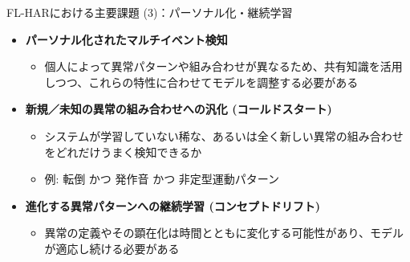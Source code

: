 \documentclass[unicode,12pt,aspectratio=169,dvipdfmx]{beamer}
\begin{document}
\begin{frame}{FL-HARにおける主要課題 (3)：パーソナル化・継続学習}
\begin{itemize}
    \item \textbf{パーソナル化されたマルチイベント検知}
    \begin{itemize}
        \item 個人によって異常パターンや組み合わせが異なるため、共有知識を活用しつつ、これらの特性に合わせてモデルを調整する必要がある
    \end{itemize}
    \item \textbf{新規／未知の異常の組み合わせへの汎化 (コールドスタート)}
    \begin{itemize}
        \item システムが学習していない稀な、あるいは全く新しい異常の組み合わせをどれだけうまく検知できるか
        \item 例: {転倒 $\textbf{かつ}$ 発作音 $\textbf{かつ}$ 非定型運動パターン}
    \end{itemize}
    \item \textbf{進化する異常パターンへの継続学習 (コンセプトドリフト)}
    \begin{itemize}
        \item 異常の定義やその顕在化は時間とともに変化する可能性があり、モデルが適応し続ける必要がある
    \end{itemize}
\end{itemize}
\end{frame}

\end{document}
